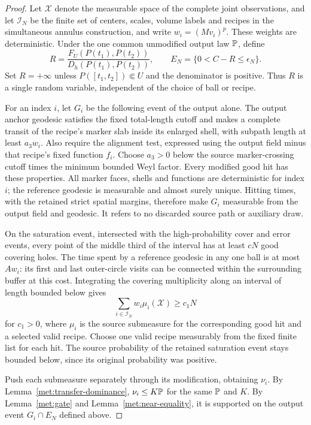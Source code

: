 \begin{proof}
Let $\mathcal X$ denote the measurable space of the complete joint
observations, and let $\mathcal I_N$ be the finite set of centers, scales, volume
labels and recipes in the simultaneous annulus construction, and
write $w_i=(Mv_i)^p$.  These weights are deterministic.  Under the
one common unmodified output law $\mathbb P$, define
\[
 R=\frac{F_U(P(t_1),P(t_2))}{D_h(P(t_1),P(t_2))},
 \qquad E_N=\{0<C-R\leq\epsilon_N\}.
\]
Set $R=+\infty$ unless $P([t_1,t_2])\Subset U$ and the denominator
is positive.  Thus $R$ is a single random variable, independent of
the choice of ball or recipe.

For an index $i$, let $G_i$ be the following event of the output
alone.  The output anchor geodesic satisfies the fixed total-length
cutoff and makes a complete transit of the recipe's marker slab
inside its enlarged shell, with subpath length at least $a_3w_i$.
Also require the alignment test, expressed using the output field
minus that recipe's fixed function $f_i$.  Choose $a_3>0$ below the
source marker-crossing cutoff times the minimum bounded Weyl factor.
Every modified good hit has these properties.  All marker faces,
shells and functions are deterministic for index $i$; the reference
geodesic is measurable and almost surely unique.  Hitting times,
with the retained strict spatial margins, therefore make $G_i$
measurable from the output field and geodesic.  It refers to no
discarded source path or auxiliary draw.

On the saturation event, intersected with the high-probability cover and
error events, every point of the middle third of the interval has
at least $cN$ good covering holes.  The time spent by a reference
geodesic in any one ball is at most $Aw_i$: its first and last
outer-circle visits can be connected within the surrounding buffer at this
cost.  Integrating the covering multiplicity along an interval of
length bounded below gives
\begin{equation}
 \sum_{i\in\mathcal I_N}w_i\mu_i(\mathcal X)\geq c_1N
 \label{met:source-weight}
\end{equation}
for $c_1>0$, where $\mu_i$ is the source submeasure for the
corresponding good hit and a selected valid recipe.  Choose one
valid recipe measurably from the fixed finite list for each hit.
The source probability of the retained saturation event stays
bounded below, since its original probability was positive.

Push each submeasure separately through its modification, obtaining
$\nu_i$.  By Lemma~\ref{met:transfer-dominance}, $\nu_i\leq K\mathbb P$
for the same $\mathbb P$ and $K$.  By Lemma~\ref{met:gate} and
Lemma~\ref{met:near-equality}, it is supported on the output event
$G_i\cap E_N$ defined above.


\end{proof}
